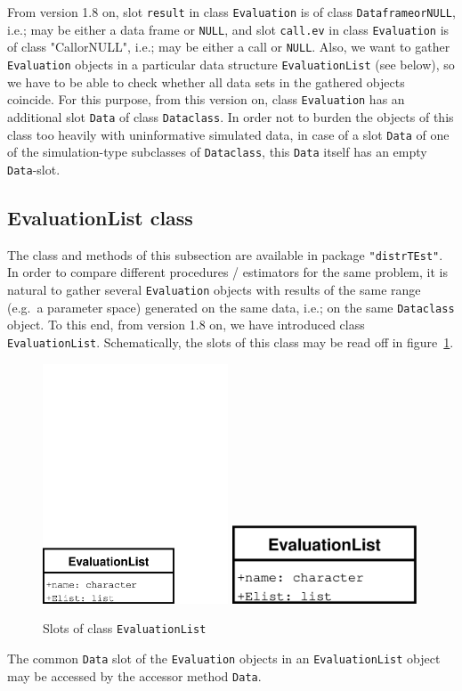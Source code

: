 \documentclass[11pt]{article}
\newcommand{\code}[1]{{\tt #1}}
\newcommand{\pkg}[1]{{\tt "#1"}}
\begin{document}
From version 1.8 on, slot \code{result} in class \code{Evaluation} is of class 
\code{DataframeorNULL}, i.e.; may be either a data frame or {\tt NULL}, and slot 
\code{call.ev} in class \code{Evaluation} is of class "CallorNULL", i.e.; may be 
either a call or {\tt NULL}. Also, we want to gather \code{Evaluation} objects 
in a particular data structure \code{EvaluationList}
(see below), so we have to be able to check whether all data sets in the 
gathered objects coincide.
For this purpose, from this version on, class \code{Evaluation} has an 
additional slot \code{Data} of class \code{Dataclass}. In order not to burden 
the objects of this class too heavily with uninformative
simulated data, in case of a slot \code{Data} of one of the simulation-type 
subclasses of \code{Dataclass},
this \code{Data}  itself has an empty \code{Data}-slot.\\

\subsection{EvaluationList class}
The class and methods of this subsection are available in package 
 \pkg{distrTEst}. \\
In order to compare different procedures / estimators for the
same problem, it is natural to gather several \code{Evaluation} objects
with results of the same range (e.g.\ a parameter space) generated on the
same data, i.e.; on the same \code{Dataclass} object. To this end, from
version 1.8 on, we have introduced class \code{EvaluationList}.
Schematically, the slots of this class may be read off in figure~\ref{fig3c1}.
\begin{figure}[htb]\label{fig3-1}
  \begin{center}
    \ifpdf
    \includegraphics[viewport=0 0 436 185,width=5.5cm]{EvaluationList.pdf}%
    \else
    \includegraphics[viewport=0 0 436 185,width=5.5cm]{EvaluationList.ps}%
    \fi
    \caption{\label{fig3c1}{\footnotesize Slots of class \code{EvaluationList}}}
  \end{center}
\end{figure}
The common \code{Data} slot of the \code{Evaluation} objects in an 
\code{EvaluationList} object may be accessed by the accessor method \code{Data}.
%
%
\end{document}
